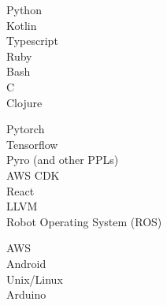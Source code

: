 \documentclass[9pt]{developercv} %
\newcommand{\CPP}
{C\nolinebreak[4]\hspace{-.05em}\raisebox{.22ex}{++ }}
\begin{document}

\begin{minipage}[t]{0.3\textwidth}
    \vspace{-\baselineskip} %


    Python\\
    Kotlin\\
    Typescript\\
    Ruby\\
    Bash\\
    \CPP \\
    Clojure
\end{minipage}
\hfill
\begin{minipage}[t]{0.3\textwidth}
    \vspace{-\baselineskip} %
    
    
    Pytorch \\
    Tensorflow \\
    Pyro (and other PPLs) \\
    AWS CDK \\
    React \\
    LLVM \\ 
    Robot Operating System (ROS)
\end{minipage}
\hfill
\begin{minipage}[t]{0.3\textwidth}
    \vspace{-\baselineskip} %
    
    
    AWS \\
    Android \\
    Unix/Linux \\
    Arduino
\end{minipage}

\end{document}
